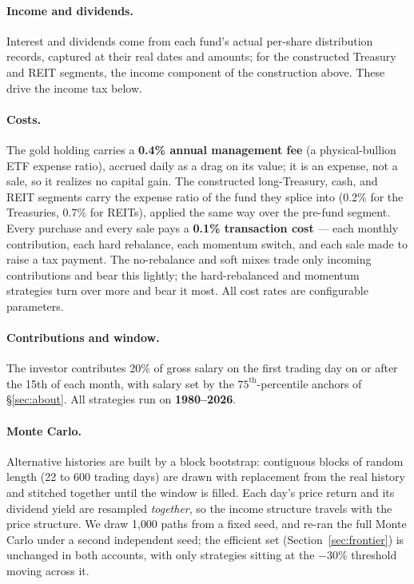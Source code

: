 \documentclass[11pt]{article}
\begin{document}
\paragraph{Income and dividends.} Interest and dividends come from each fund's actual per-share
distribution records, captured at their real dates and amounts; for the constructed Treasury and REIT
segments, the income component of the construction above. These drive the income tax below.

\paragraph{Costs.} The gold holding carries a \textbf{0.4\% annual management fee} (a physical-bullion ETF
expense ratio), accrued daily as a drag on its value; it is an expense, not a sale, so it realizes no
capital gain. The constructed long-Treasury, cash, and REIT segments carry the expense ratio of the
fund they splice into (0.2\% for the Treasuries, 0.7\% for REITs), applied the same way over the
pre-fund segment. Every purchase and every sale pays a \textbf{0.1\% transaction cost} --- each monthly
contribution, each hard rebalance, each momentum switch, and each sale made to raise a tax payment. The
no-rebalance and soft mixes trade only incoming contributions and bear this lightly; the hard-rebalanced
and momentum strategies turn over more and bear it most. All cost rates are configurable parameters.

\paragraph{Contributions and window.} The investor contributes 20\% of gross salary on the first
trading day on or after the 15th of each month, with salary set by the $75^{\text{th}}$-percentile
anchors of \S\ref{sec:about}. All strategies run on \textbf{1980--2026}.

\paragraph{Monte Carlo.} Alternative histories are built by a block bootstrap: contiguous blocks of
random length (22 to 600 trading days) are drawn with replacement from the real history and stitched
together until the window is filled. Each day's price return and its dividend yield are resampled
\emph{together}, so the income structure travels with the price structure. We draw 1{,}000 paths from a
fixed seed, and re-ran the full Monte Carlo under a second independent seed; the efficient set
(Section~\ref{sec:frontier}) is unchanged in both accounts, with only strategies sitting at the $-30\%$
threshold moving across it.
\end{document}

